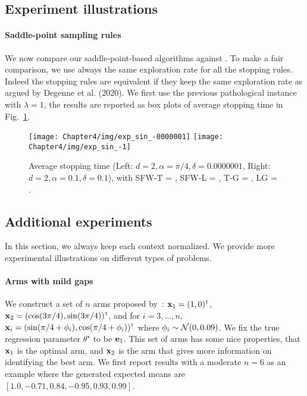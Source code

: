\subsection{Experiment illustrations}

\paragraph{Saddle-point sampling rules}
We now compare our saddle-point-based algorithms against \LGapE. To make a fair comparison, we use always the same exploration rate for all the stopping rules. Indeed the stopping rules are equivalent if they keep the same exploration rate as argued by Degenne et al. (2020). We first use the previous pathological instance with $\lambda=1$, the results are reported as box plots of average stopping time in Fig.~\ref{fig:exp1}.

\begin{figure}[t!]
    \centering
    \texttt{[image: Chapter4/img/exp\_sin\_-0000001]}
    \texttt{[image: Chapter4/img/exp\_sin\_-1]}
    \caption{Average stopping time (Left: $d=2,\alpha=\pi/4,\delta=0.0000001$, Right: $d=2,\alpha=0.1,\delta=0.1$), with SFW-T = \SLTCC, SFW-L = \SLGapE, T-G = \LTCC, LG = \LGapE.}
    \label{fig:exp1}
\end{figure}

\subsection{Additional experiments}

In this section, we always keep each context normalized. We provide more experimental illustrations on different types of problems.

\paragraph{Arms with mild gaps}
We construct a set of $n$ arms proposed by~\cite{fiez2019transductive}: ${\bf x}_1=(1,0)^\mathsf{\scriptscriptstyle T}$, ${\bf x}_2=(\cos(3\pi/4),\sin(3\pi/4))^\mathsf{\scriptscriptstyle T}$, and for $i = 3,\ldots,n$, ${\bf x}_i=(\sin(\pi/4+\phi_i),\cos(\pi/4+\phi_i))^\mathsf{\scriptscriptstyle T}$ where $\phi_i\sim\mathcal{N}(0,0.09)$. We fix the true regression parameter $\theta^\star$ to be ${\bf e}_1$. This set of arms has some nice properties, that ${\bf x}_1$ is the optimal arm, and ${\bf x}_2$ is the arm that gives more information on identifying the best arm. We first report results with a moderate $n=6$ as an example where the generated expected means are $[1.0, -0.71, 0.84, -0.95, 0.93, 0.99]$.

